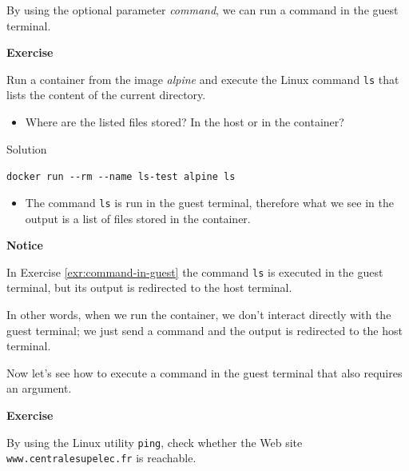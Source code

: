 \documentclass[
]{article}
\providecommand{\tightlist}{%
  \setlength{\itemsep}{0pt}\setlength{\parskip}{0pt}}
\newenvironment{infobox}[1]
  {
  \begin{itemize}
  \renewcommand{\labelitemi}{
    \raisebox{-.7\height}[0pt][0pt]{
      
    }
  }
  \setlength{\fboxsep}{1em}
  \begin{whitebox}
  \item
  }
  {
  \end{whitebox}
  \end{itemize}
  }
\theoremstyle{definition}
\theoremstyle{definition}
\theoremstyle{definition}
\theoremstyle{remark}
\let\BeginKnitrBlock\begin \let\EndKnitrBlock\end
\begin{document}
By using the optional parameter \emph{command}, we can run
a command in the guest terminal.

\begin{infobox}{exercisebox}

\textbf{Exercise}

\BeginKnitrBlock{exercise}
\label{exr:command-in-guest}{\label{exr:command-in-guest} }
Run a container from the image \emph{alpine} and execute the
Linux command \texttt{ls} that lists the content of the current directory.

\begin{itemize}
\tightlist
\item
  Where are the listed files stored?
  In the host or in the container?
\end{itemize}
\EndKnitrBlock{exercise}

\end{infobox}

Solution

\begin{infobox}{exercisebox}

\texttt{docker\ run\ -\/-rm\ -\/-name\ ls-test\ alpine\ ls}

\begin{itemize}
\tightlist
\item
  The command \texttt{ls} is run in the guest terminal, therefore
  what we see in the output is a list of files stored in the
  container.
\end{itemize}

\end{infobox}

\begin{infobox}{warning}
\textbf{Notice}

In Exercise \ref{exr:command-in-guest} the command
\texttt{ls} is executed in the guest terminal, but its
output is redirected to the host terminal.

In other words, when we run the container, we
don't interact directly with the guest terminal;
we just send a command and the output is redirected
to the host terminal.

\end{infobox}

Now let's see how to execute a command in the guest terminal
that also requires an argument.

\begin{infobox}{exercisebox}

\textbf{Exercise}

\BeginKnitrBlock{exercise}
\label{exr:unnamed-chunk-8}{\label{exr:unnamed-chunk-8} }By using the Linux utility \texttt{ping}, check
whether the Web site \texttt{www.centralesupelec.fr} is reachable.
\EndKnitrBlock{exercise}

\end{infobox}
\end{document}
